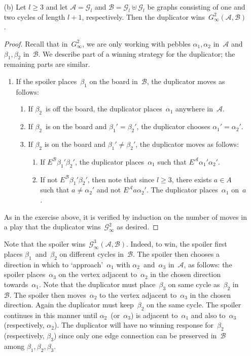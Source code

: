 \documentclass[letterpaper]{article}
\newcommand{\A}{\mathcal{A}}
\newcommand{\B}{\mathcal{B}}
\newcommand{\G}{\mathcal{G}}
\newcommand{\dunion}{\uplus}
\theoremstyle{plain}
\begin{document}
\begin{enumerate}
\begin{proof}
Thus the duplicator wins~$G_{\infty}^s(\A,\B)$.
\end{proof}
\item[(b)] Let $l\ge3$ and let $\A=\G_l$ and $\B=\G_l\dunion\G_l$ be graphs consisting of one and two cycles of length $l+1$, respectively. Then the duplicator wins~$G_{\infty}^2(\A,\B)$.
\begin{proof}
Recall that in~$G_{\infty}^2$, we are only working with pebbles $\alpha_1,\alpha_2$ in~$\A$ and $\beta_1,\beta_2$ in~$\B$. We describe part of a winning strategy for the duplicator; the remaining parts are similar.
\begin{enumerate}
\item If the spoiler places~$\beta_1$ on the board in~$\B$, the duplicator moves as follows:
\begin{enumerate}
\item If $\beta_2$~is off the board, the duplicator places~$\alpha_1$ anywhere in~$\A$.
\item If $\beta_2$~is on the board and $\beta_1'=\beta_2'$, the duplicator chooses $\alpha_1'=\alpha_2'$.
\item If $\beta_2$ is on the board and $\beta_1'\ne\beta_2'$, the duplicator moves as follows:
\begin{enumerate}
\item If $E^{\B}\beta_1'\beta_2'$, the duplicator places~$\alpha_1$ such that $E^{\A}\alpha_1'\alpha_2'$.
\item If not $E^{\B}\beta_1'\beta_2'$, then note that since $l\ge3$, there exists $a\in A$ such that $a\ne\alpha_2'$ and not $E^{\A}a\alpha_2'$. The duplicator places~$\alpha_1$ on~$a$.
\end{enumerate}
\end{enumerate}
\end{enumerate}
As in the exercise above, it is verified by induction on the number of moves in a play that the duplicator wins~$\G_{\infty}^2$ as desired.
\end{proof}
Note that the spoiler wins~$\G_{\infty}^3(\A,\B)$. Indeed, to win, the spoiler first places $\beta_1$~and~$\beta_2$ on different cycles in~$\B$. The spoiler then chooses a direction in which to `approach'~$\alpha_1$ with $\alpha_2$~and~$\alpha_3$ in~$\A$, as follows: the spoiler places~$\alpha_3$ on the vertex adjacent to~$\alpha_2$ in the chosen direction towards~$\alpha_1$. Note that the duplicator must place~$\beta_3$ on same cycle as~$\beta_2$ in~$\B$. The spoiler then moves~$\alpha_2$ to the vertex adjacent to~$\alpha_3$ in the chosen direction. Again the duplicator must keep~$\beta_2$ on the same cycle. The spoiler continues in this manner until $\alpha_2$~(or~$\alpha_3$) is adjacent to~$\alpha_1$ and also to~$\alpha_3$ (respectively, $\alpha_2$). The duplicator will have no winning response for~$\beta_2$ (respectively, $\beta_3$) since only one edge connection can be preserved in~$\B$ among $\beta_1,\beta_2,\beta_3$.
\end{enumerate}
\end{document}
